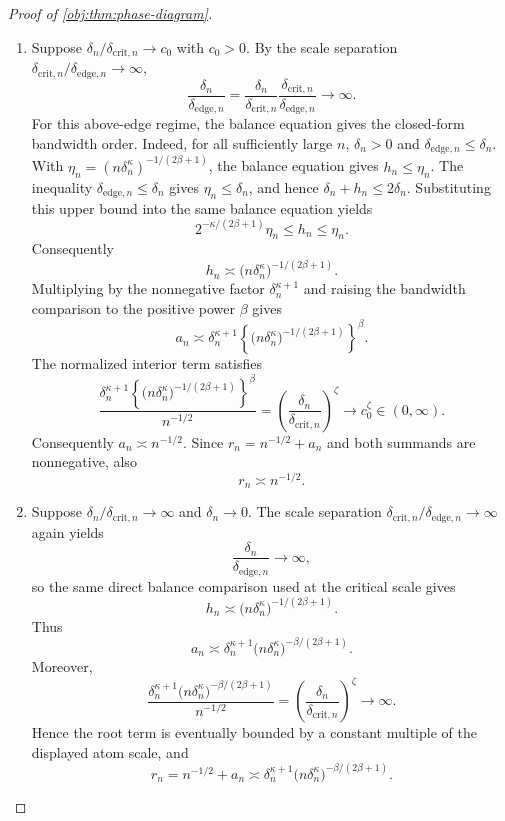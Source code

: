 \begin{proof}[Proof of \cref{obj:thm:phase-diagram}]
\begin{enumerate}
\item Suppose \(\delta_n/\delta_{\mathrm{crit},n}\to c_0\) with \(c_0>0\).
By the scale separation \(\delta_{\mathrm{crit},n}/\delta_{\mathrm{edge},n}\to\infty\),
\[
\frac{\delta_n}{\delta_{\mathrm{edge},n}}
=
\frac{\delta_n}{\delta_{\mathrm{crit},n}}
\frac{\delta_{\mathrm{crit},n}}{\delta_{\mathrm{edge},n}}
\to\infty .
\]
For this above-edge regime, the balance equation gives the closed-form bandwidth
order.  Indeed, for all sufficiently large \(n\),
\(\delta_n>0\) and \(\delta_{\mathrm{edge},n}\le\delta_n\).  With
\(\eta_n=(n\delta_n^\kappa)^{-1/(2\beta+1)}\), the balance equation gives
\(h_n\le \eta_n\).  The inequality \(\delta_{\mathrm{edge},n}\le\delta_n\) gives
\(\eta_n\le\delta_n\), and hence \(\delta_n+h_n\le2\delta_n\).  Substituting this
upper bound into the same balance equation yields
\[
2^{-\kappa/(2\beta+1)} \eta_n\le h_n\le \eta_n .
\]
Consequently
\[
h_n\asymp \bigl(n\delta_n^\kappa\bigr)^{-1/(2\beta+1)} .
\]
Multiplying by the nonnegative factor \(\delta_n^{\kappa+1}\) and raising the
bandwidth comparison to the positive power \(\beta\) gives
\[
a_n\asymp
\delta_n^{\kappa+1}
\left\{\bigl(n\delta_n^\kappa\bigr)^{-1/(2\beta+1)}\right\}^{\beta}.
\]
The normalized interior term satisfies
\[
\frac{
\delta_n^{\kappa+1}
\left\{\bigl(n\delta_n^\kappa\bigr)^{-1/(2\beta+1)}\right\}^{\beta}
}{n^{-1/2}}
=
\left(\frac{\delta_n}{\delta_{\mathrm{crit},n}}\right)^\zeta
\to c_0^\zeta\in(0,\infty).
\]
Consequently \(a_n\asymp n^{-1/2}\).  Since
\(r_n=n^{-1/2}+a_n\) and both summands are nonnegative, also
\[
r_n\asymp n^{-1/2}.
\]

\item Suppose \(\delta_n/\delta_{\mathrm{crit},n}\to\infty\) and
\(\delta_n\to0\).  The scale separation
\(\delta_{\mathrm{crit},n}/\delta_{\mathrm{edge},n}\to\infty\) again yields
\[
\frac{\delta_n}{\delta_{\mathrm{edge},n}}\to\infty,
\]
so the same direct balance comparison used at the critical scale gives
\[
h_n\asymp \bigl(n\delta_n^\kappa\bigr)^{-1/(2\beta+1)} .
\]
Thus
\[
a_n\asymp
\delta_n^{\kappa+1}
\bigl(n\delta_n^\kappa\bigr)^{-\beta/(2\beta+1)} .
\]
Moreover,
\[
\frac{
\delta_n^{\kappa+1}
\bigl(n\delta_n^\kappa\bigr)^{-\beta/(2\beta+1)}
}{n^{-1/2}}
=
\left(\frac{\delta_n}{\delta_{\mathrm{crit},n}}\right)^\zeta
\to\infty .
\]
Hence the root term is eventually bounded by a constant multiple of the
displayed atom scale, and
\[
r_n
=
n^{-1/2}+a_n
\asymp
\delta_n^{\kappa+1}
\bigl(n\delta_n^\kappa\bigr)^{-\beta/(2\beta+1)} .
\]


\end{enumerate}
\end{proof}
